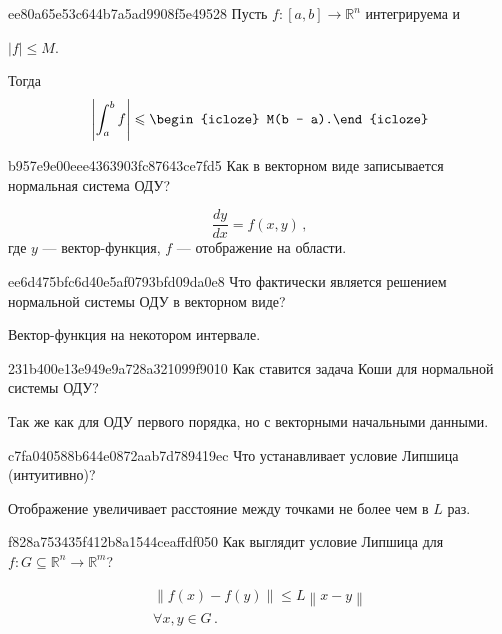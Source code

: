 \begin{note}{ee80a65e53c644b7a5ad9908f5e49528}
    Пусть \({ f : [a, b] \to \mathbb R^{n} }\) интегрируема и \begin{icloze}{2}\({ \left\lvert f \right\rvert \leqslant M }\).\end{icloze}
    Тогда
    \[
        \left\lvert \int_{a}^{b} f \right\rvert \leqslant \begin{icloze}{1}M(b - a).\end{icloze}
    \]
\end{note}

\begin{note}{b957e9e00eee4363903fc87643ce7fd5}
    Как в векторном виде записывается нормальная система ОДУ?

    \begin{cloze}{1}
        \[
            \frac{dy}{dx} = f(x, y)\,,
        \]
        где \({ y }\) --- вектор-функция, \({ f }\) --- отображение на области.
    \end{cloze}
\end{note}

\begin{note}{ee6d475bfc6d40e5af0793bfd09da0e8}
    Что фактически является решением нормальной системы ОДУ в векторном виде?

    \begin{cloze}{1}
        Вектор-функция на некотором интервале.
    \end{cloze}
\end{note}

\begin{note}{231b400e13e949e9a728a321099f9010}
    Как ставится задача Коши для нормальной системы ОДУ?

    \begin{cloze}{1}
        Так же как для ОДУ первого порядка, но с векторными начальными данными.
    \end{cloze}
\end{note}

\begin{note}{c7fa040588b644e0872aab7d789419ec}
    Что устанавливает условие Липшица (интуитивно)?

    \begin{cloze}{1}
        Отображение увеличивает расстояние между точками не более чем в \({ L }\) раз.
    \end{cloze}
\end{note}

\begin{note}{f828a753435f412b8a1544ceaffdf050}
    Как выглядит условие Липшица для \({ f : G \subseteq \mathbb R^{n} \to \mathbb R^{m} }\)?

    \begin{cloze}{1}
        \begin{gather*}
            \left\lVert f(x) - f(y) \right\rVert \leqslant L\left\lVert x - y \right\rVert \\
            \forall x, y \in G\,.
        \end{gather*}
    \end{cloze}
\end{note}

